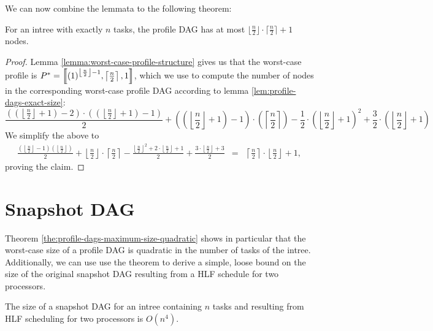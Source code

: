 We can now combine the lemmata to the following theorem:

\begin{theorem}
  \label{the:profile-dags-maximum-size-quadratic}
  For an intree with exactly $n$ tasks, the profile DAG has at most $\lfloor \frac{n}{2} \rfloor \cdot \lceil \frac{n}{2} \rceil +1$ nodes.
\end{theorem}

\begin{proof}
  Lemma \ref{lemma:worst-case-profile-structure} gives us that the worst-case profile is $P^*=\left\llbracket  {(1)}^{ \left\lfloor\frac{n}{2} \right\rfloor - 1}, \left\lceil \frac{n}{2} \right\rceil, 1  \right\rrbracket$, which we use to compute the number of nodes in the corresponding worst-case profile DAG according to lemma \ref{lem:profile-dags-exact-size}:
  \renewcommand{\r}{\left(\left\lfloor\frac{n}{2}\right\rfloor + 1\right)}
  \begin{equation*}
    \frac{(\r-2)\cdot(\r-1)}{2} + 
    \left(\r-1\right)\cdot\left( \left\lceil \frac{n}{2} \right\rceil \right)
    - \frac{1}{2} \cdot \r^2 + \frac{3}{2} \cdot \r     
  \end{equation*}
  We simplify the above to
  \newcommand{\ceiln}{\left\lceil \frac{n}{2} \right\rceil}
  \newcommand{\floorn}{\left\lfloor \frac{n}{2} \right\rfloor}
  \begin{eqnarray*}
    \frac{\left( \floorn -1 \right)\left( \floorn \right)}{2}
    + \floorn \cdot \ceiln
    - \frac{\floorn^2 + 2\cdot \floorn + 1}{2}
    + \frac{3\cdot \floorn + 3}{2}
    & = &
    \ceiln \cdot \floorn + 1,
  \end{eqnarray*}
  proving the claim.
\end{proof}

\section{Snapshot DAG}
\label{sec:p2-snapshot-dag}

Theorem \ref{the:profile-dags-maximum-size-quadratic} shows in particular that the worst-case size of a profile DAG is quadratic in the number of tasks of the intree. Additionally, we can use use the theorem to derive a simple, loose bound on the size of the original snapshot DAG resulting from a HLF schedule for two processors.

\begin{corollary}
  The size of a snapshot DAG for an intree containing $n$ tasks and resulting from HLF scheduling for two processors is $O(n^4)$.
\end{corollary}

